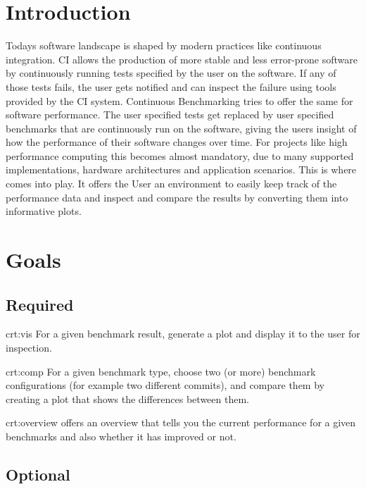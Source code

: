 \section{Introduction}

Todays software landscape is shaped by modern practices like continuous integration. CI allows the production of more stable and less error-prone software by continuously running tests specified by the user on the software. If any of those tests fails, the user gets notified and can inspect the failure using tools provided by the CI system. Continuous Benchmarking tries to offer the same for software performance. The user specified tests get replaced by user specified benchmarks that are continuously run on the software, giving the users insight of how the performance of their software changes over time. For projects like high performance computing this becomes almost mandatory, due to many supported implementations, hardware architectures and application scenarios. This is where \parkview{} comes into play. It offers the User an environment to easily keep track of the performance data and inspect and compare the results by converting them into informative plots.

\section{Goals}

\subsection{Required}

{crt:vis}
{For a given \gls{benchmark result}, generate a \gls{plot} and display it to the user for inspection.}

{crt:comp}
{For a given benchmark type, choose two (or more) \glspl{benchmark configuration} (for example two different commits), and compare them by creating a plot that shows the differences between them.}

{crt:overview}
{\parkview offers an overview that tells you the current performance for a given benchmarks and also whether it has improved or not.}

\subsection{Optional}

